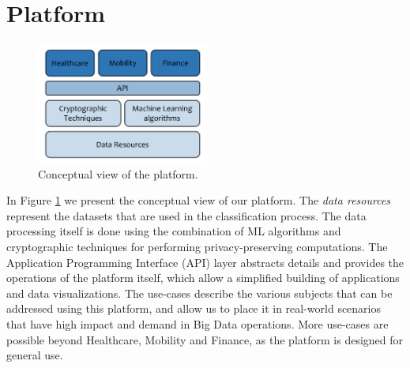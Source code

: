 
\section{Platform}
\label{sec:components}




\begin{figure}
 \centering
  \includegraphics[width=0.5\textwidth]{images/conceptual_view_of_the_platform.pdf}
  \caption{Conceptual view of the platform.}
  \label{fig:ConceptView}
\end{figure}

In Figure \ref{fig:ConceptView} we present the conceptual view of our platform. 
The \emph{data resources} represent the datasets that are used in the classification process. 
The data processing itself is done using the combination of ML algorithms and cryptographic techniques for performing privacy-preserving computations. 
The Application Programming Interface (API) layer abstracts details and provides the operations of the platform itself, which allow a simplified building of applications and data visualizations.
The use-cases describe the various subjects that can be addressed using this platform, and allow us to place it in real-world scenarios that have high impact and demand in Big Data operations. More use-cases are possible beyond Healthcare, Mobility and Finance, as the platform is designed for general use.









